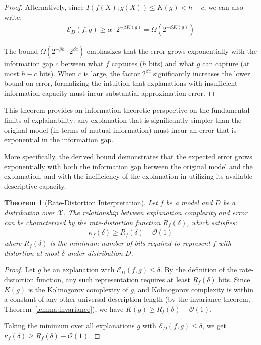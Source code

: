 \documentclass[11pt,letter,leqno]{article}
\newtheorem{theorem}{Theorem}[section]
\begin{document}
\begin{proof}
Alternatively, since $I(f(X); g(X)) \leq K(g) < h - c$, we can also write:
\begin{align}
\mathcal{E}_D(f, g) \geq \alpha \cdot 2^{-\beta K(g)} = \Omega(2^{-\beta K(g)})
\end{align}

The bound $\Omega(2^{-\beta h} \cdot 2^{\beta c})$ emphasizes that the error 
grows exponentially with the information gap $c$ between what $f$ captures 
($h$ bits) and what $g$ can capture (at most $h - c$ bits). When $c$ is large, 
the factor $2^{\beta c}$ significantly increases the lower bound on error, 
formalizing the intuition that explanations with insufficient information 
capacity must incur substantial approximation error.
\end{proof}

This theorem provides an information-theoretic perspective on the fundamental limits of explainability: any explanation that is significantly simpler than the original model (in terms of mutual information) must incur an error that is exponential in the information gap.

More specifically, the derived bound demonstrates that the expected error grows exponentially with both the information gap between the original model and the explanation, and with the inefficiency of the explanation in utilizing its available descriptive capacity.

\begin{theorem}[Rate-Distortion Interpretation]
\label{thm:rate-distortion}
Let $f$ be a model and $D$ be a distribution over $\mathcal{X}$.  The relationship between explanation complexity and error can be characterized by the rate-distortion function $R_f(\delta)$, which satisfies:
\begin{align}
\kappa_f(\delta) \geq R_f(\delta) - \mathcal{O}(1)
\end{align}
where $R_f(\delta)$ is the minimum number of bits required to represent $f$ with distortion at most $\delta$ under distribution $D$.
\end{theorem}

\begin{proof}
Let $g$ be an explanation with $\mathcal{E}_D(f, g) \leq \delta$.  By the definition of the rate-distortion function, any such representation requires at least $R_f(\delta)$ bits.  Since $K(g)$ is the Kolmogorov complexity of $g$, and Kolmogorov complexity is within a constant of any other universal description length (by the invariance theorem, Theorem~\ref{lemma:invariance}), we have $K(g) \geq R_f(\delta) - \mathcal{O}(1)$.

Taking the minimum over all explanations $g$ with $\mathcal{E}_D(f, g) \leq \delta$, we get $\kappa_f(\delta) \geq R_f(\delta) - \mathcal{O}(1)$.
\end{proof}
\end{document}
